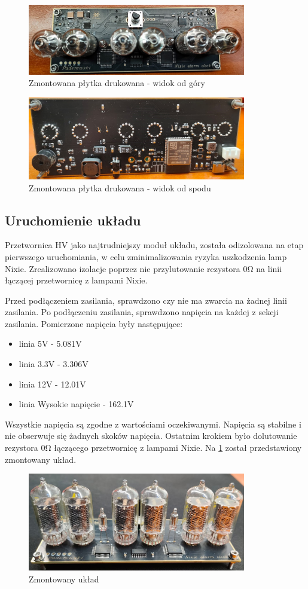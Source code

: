 \documentclass[../main.tex]{subfiles}
\begin{document}
\begin{figure}[H]
    \centering
    \includegraphics[width=0.85\textwidth]{gora.jpeg}
    \caption{Zmontowana płytka drukowana - widok od góry}
\end{figure}

\begin{figure}[H]
    \centering
    \includegraphics[width=0.85\textwidth]{dol.jpeg}
    \caption{Zmontowana płytka drukowana - widok od spodu}
\end{figure}


\subsection{Uruchomienie układu}
Przetwornica HV jako najtrudniejszy moduł układu, została odizolowana na etap pierwszego uruchomiania, w celu zminimalizowania ryzyka uszkodzenia lamp Nixie. Zrealizowano izolacje
poprzez nie przylutowanie rezystora 0\si{\ohm} na linii łączącej przetwornicę z lampami Nixie. 

Przed podłączeniem zasilania, sprawdzono czy nie ma zwarcia na żadnej linii zasilania.
Po podłączeniu zasilania, sprawdzono napięcia na każdej z sekcji zasilania. Pomierzone napięcia były następujące:
\begin{itemize}
    \item linia 5V - 5.081V
    \item linia 3.3V - 3.306V
    \item linia 12V - 12.01V
    \item linia Wysokie napięcie - 162.1V
\end{itemize}

Wszystkie napięcia są zgodne z wartościami oczekiwanymi. Napięcia są stabilne i nie obserwuje się żadnych skoków napięcia.
Ostatnim krokiem było dolutowanie rezystora 0\si{\ohm} łączącego przetwornicę z lampami Nixie. Na \ref{fig:zmontowany_uklad} został przedstawiony zmontowany układ.

\begin{figure}[H]
    \centering
    \includegraphics[width=0.85\textwidth]{gotowy.jpeg}
    \caption{Zmontowany układ}
    \label{fig:zmontowany_uklad}
\end{figure}
\end{document}
